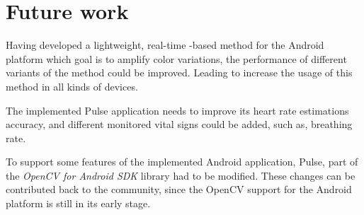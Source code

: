 \section{Future work} \label{sec:conclusions:future}

Having developed a lightweight, real-time \evm{}-based method for the
Android platform which goal is to amplify color variations, the performance
of different variants of the \evm{} method could be improved. Leading
to increase the usage of this method in all kinds of devices.

The implemented Pulse application needs to improve its heart rate estimations
accuracy, and different monitored vital signs could be added, such as,
breathing rate.

To support some features of the implemented Android application, Pulse,
part of the \emph{OpenCV for Android SDK} library had to be modified. These
changes can be contributed back to the community, since the OpenCV support
for the Android platform is still in its early stage.

